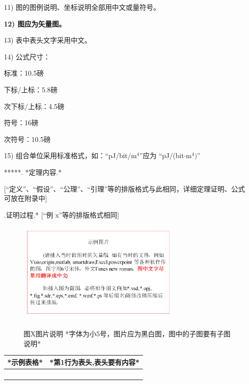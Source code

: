 \documentclass[10.5pt,compsoc]{CjC}
\theoremstyle{mystyle}
\begin{document}
{11) 图的图例说明、坐标说明全部用中文或量符号。

\textbf{12) 图应为矢量图。}

13) 表中表头文字采用中文。

14) 公式尺寸：

标准：10.5磅

下标/上标：5.8磅

次下标/上标：4.5磅

符号：16磅

次符号：10.5磅

15) 组合单位采用标准格式，如：``pJ/bit/m$^{4}$''应为 ``pJ/(bit$\cdot
$m$^{4})$''

{}\quad ******. *定理内容.*

[``定义''、``假设''、``公理''、``引理''等的排版格式与此相同，详细定理证明、公式可放在附录中]

{}.\quad  *证明过程.* [``例 x''等的排版格式相同]


\begin{figure}[htbp]
\centerline{\includegraphics[width=3.15in,height=1.98in]{CJC1.pdf}}
图X\quad  图片说明 *字体为小5号，图片应为黑白图，图中的子图要有子图说明*
\label{fig1}
\end{figure}

\begin{table}[htbp]
\vspace {-2.5mm}
\begin{center}
\begin{tabular}{ll}
\toprule
*示例表格*&*第1行为表头,表头要有内容* \\
\hline
&
 \\
&
 \\
&
 \\
&
 \\
\bottomrule
\end{tabular}
\label{tab1}
\end{center}
\end{table}

}
\end{document}
